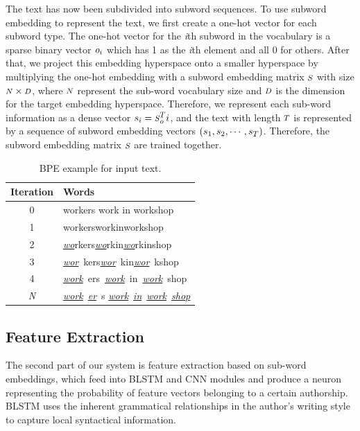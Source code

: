 \documentclass[conference]{IEEEtran}
\newcommand*{\Scale}[2][4]{\scalebox{#1}{$#2$}}%
\begin{document}
The text has now been subdivided into subword sequences. To use subword embedding to represent the text, we first create a one-hot vector for each subword type. The one-hot vector for the \textit{i}th subword in the vocabulary is a sparse binary vector $\emph{o}_{i}$ which has 1 as the \textit{i}th element and all 0 for others. After that, we project this embedding hyperspace onto a smaller hyperspace by multiplying the one-hot embedding with a subword embedding matrix $\mathcal{\Scale[0.8]S}$ with size $\mathcal{\Scale[0.8]N}\times\mathcal{\Scale[0.8]D}$, where $\mathcal{\Scale[0.8]N}$ represent the sub-word vocabulary size and $\mathcal{\Scale[0.8]D}$ is the dimension for the target embedding hyperspace. Therefore, we represent each sub-word information as a dense vector $s_i=\mathcal{\Scale[0.8]S}^{\Scale[0.8]T}_o{i}$, and the text with length $\mathcal{\Scale[0.8]T}$ is represented by a sequence of subword embedding vectors $(s_1,s_2,\cdots,s_{\Scale[0.8]T})$. Therefore, the subword embedding matrix $\mathcal{\Scale[0.8]S}$ are trained together.
\begin{table}[!t]
\renewcommand{\arraystretch}{1}
\caption{BPE example for input text.}
\label{table1}
\centering
\begin{tabular}{cl}
\hline
\textbf{Iteration} & \textbf{Words}\\
\hline
0 & workers work in workshop\\
1 & workersworkinworkshop\\
2 & \underline{\textit{wo}}rkers\underline{\textit{wo}}rkin\underline{\textit{wo}}rkinshop\\
3& \underline{\textit{wor}}~kers\underline{\textit{wor}}~kin\underline{\textit{wor}}~kshop\\
4& \underline{\textit{work}}~ers~\underline{\textit{work}}~in~\underline{\textit{work}}~shop\\
\textit{N}& \underline{\textit{work}}~\underline{\textit{er}}~s \underline{\textit{work}}~\underline{\textit{in}}~\underline{\textit{work}}~\underline{\textit{shop}}\\
\hline
\end{tabular}
\end{table}
\subsection{Feature Extraction}
The second part of our system is feature extraction based on sub-word embeddings, which feed into BLSTM and CNN modules and produce a neuron representing the probability of feature vectors belonging to a certain authorship. BLSTM uses the inherent grammatical relationships in the author's writing style to capture local syntactical information.
\end{document}
